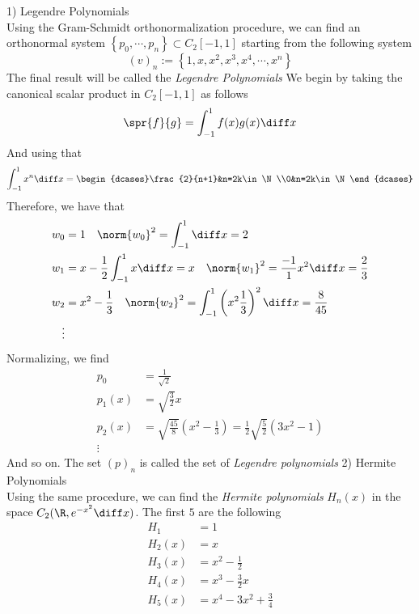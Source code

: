 \documentclass[../mmf.tex]{subfiles}
\begin{document}
\begin{eg}
	1) Legendre Polynomials\\
	Using the Gram-Schmidt orthonormalization procedure, we can find an orthonormal system $\left\{ p_0,\cdots,p_n \right\}\subset C_2[-1,1]$ starting from the following system
	\begin{equation*}
		(v)_n:=\left\{ 1,x,x^2,x^3,x^4,\cdots,x^n \right\}
	\end{equation*}
	The final result will be called the \textit{Legendre Polynomials}
	We begin by taking the canonical scalar product in $C_2[-1,1]$ as follows
	\begin{equation*}
		\spr{f}{g}=\int_{-1}^{1}f(x)g(x)\diff x
	\end{equation*}
	And using that
	\begin{equation*}
		\int_{-1}^{1}x^n\diff x=\begin{dcases}\frac{2}{n+1}&n=2k\in\N\\0&n=2k\in\N\end{dcases}
	\end{equation*}
	Therefore, we have that
	\begin{equation*}
		\begin{aligned}
			w_0&=1\quad\norm{w_0}^2=\int_{-1}^{1}\diff x=2\\
			w_1&=x-\frac{1}{2}\int_{-1}^{1}x\diff x=x\quad\norm{w_1}^2=\frac{-1}{1}x^2\diff x=\frac{2}{3}\\
			w_2&=x^2-\frac{1}{3}\quad\norm{w_2}^2=\int_{-1}^{1}\left( x^2\frac{1}{3} \right)^2\diff x=\frac{8}{45}\\
			\vdots&
		\end{aligned}
	\end{equation*}
	Normalizing, we find
	\begin{equation*}
		\begin{aligned}
			p_0&=\frac{1}{\sqrt{2}}\\
			p_1(x)&=\sqrt{\frac{3}{2}}x\\
			p_2(x)&=\sqrt{\frac{45}{8}}\left( x^2-\frac{1}{3} \right)=\frac{1}{2}\sqrt{\frac{5}{2}}\left( 3x^2-1 \right)\\
			\vdots&
		\end{aligned}
	\end{equation*}
	And so on. The set $(p)_n$ is called the set of \textit{Legendre polynomials}
	2) Hermite Polynomials\\
	Using the same procedure, we can find the \textit{Hermite polynomials} $H_n(x)$ in the space $C_2(\R,e^{-x^2}\diff x)$. The first $5$ are the following
	\begin{equation*}
		\begin{aligned}
			H_1&=1\\
			H_2(x)&=x\\
			H_3(x)&=x^2-\frac{1}{2}\\
			H_4(x)&=x^3-\frac{3}{2}x\\
			H_5(x)&=x^4-3x^2+\frac{3}{4}
		\end{aligned}
	\end{equation*}
\end{eg}
\end{document}
